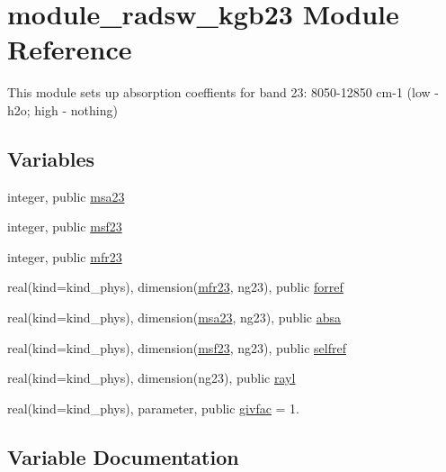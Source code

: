 \hypertarget{namespacemodule__radsw__kgb23}{}\section{module\+\_\+radsw\+\_\+kgb23 Module Reference}
\label{namespacemodule__radsw__kgb23}


This module sets up absorption coeffients for band 23\+: 8050-\/12850 cm-\/1 (low -\/ h2o; high -\/ nothing)  


\subsection*{Variables}
\begin{DoxyCompactItemize}
\item 
integer, public \hyperlink{namespacemodule__radsw__kgb23_a744e7ef73b8d3cc01ff9c6a6010d95d7}{msa23}
\item 
integer, public \hyperlink{namespacemodule__radsw__kgb23_ab96959c26232963a568609451483843e}{msf23}
\item 
integer, public \hyperlink{namespacemodule__radsw__kgb23_a78b43ec4bc2afd4f520480a8410d9df5}{mfr23}
\item 
real(kind=kind\+\_\+phys), dimension(\hyperlink{namespacemodule__radsw__kgb23_a78b43ec4bc2afd4f520480a8410d9df5}{mfr23}, ng23), public \hyperlink{namespacemodule__radsw__kgb23_a18fabad311919ee30b2d367fbe250bcc}{forref}
\item 
real(kind=kind\+\_\+phys), dimension(\hyperlink{namespacemodule__radsw__kgb23_a744e7ef73b8d3cc01ff9c6a6010d95d7}{msa23}, ng23), public \hyperlink{namespacemodule__radsw__kgb23_a2541e41c7d445a2ce73283e2fb76270c}{absa}
\item 
real(kind=kind\+\_\+phys), dimension(\hyperlink{namespacemodule__radsw__kgb23_ab96959c26232963a568609451483843e}{msf23}, ng23), public \hyperlink{namespacemodule__radsw__kgb23_ae4e51bcb3c3cbaaf1476d5ab18b072e5}{selfref}
\item 
real(kind=kind\+\_\+phys), dimension(ng23), public \hyperlink{namespacemodule__radsw__kgb23_a40006f284543c7347eced417b9de2fc6}{rayl}
\item 
real(kind=kind\+\_\+phys), parameter, public \hyperlink{namespacemodule__radsw__kgb23_a5f6ced06169db4b7470e20d5639ac54c}{givfac} = 1.
\end{DoxyCompactItemize}


\subsection{Variable Documentation}
